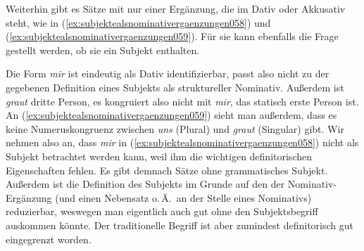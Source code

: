 \begin{exe}
  \ex\label{ex:subjektealsnominativergaenzungen052}
  \begin{xlist}
  \end{xlist}
  \ex\label{ex:subjektealsnominativergaenzungen055}
  \begin{xlist}
  \end{xlist}
\end{exe}

Weiterhin gibt es Sätze mit nur einer Ergänzung, die im Dativ oder Akkusativ steht, wie in (\ref{ex:subjektealsnominativergaenzungen058}) und (\ref{ex:subjektealsnominativergaenzungen059}).
Für sie kann ebenfalls die Frage gestellt werden, ob sie ein Subjekt enthalten.

\begin{exe}
\end{exe}

Die Form \textit{mir} ist eindeutig als Dativ identifizierbar, passt also nicht zu der gegebenen Definition eines Subjekts als struktureller Nominativ.
Außerdem ist \textit{graut} dritte Person, es kongruiert also nicht mit \textit{mir}, das statisch erste Person ist.
An (\ref{ex:subjektealsnominativergaenzungen059}) sieht man außerdem, dass es keine Numeruskongruenz zwischen \textit{uns} (Plural) und
\textit{graut} (Singular) gibt.
Wir nehmen also an, dass \textit{mir} in (\ref{ex:subjektealsnominativergaenzungen058}) nicht als Subjekt betrachtet werden kann, weil ihm die wichtigen definitorischen Eigenschaften fehlen.
Es gibt demnach Sätze ohne grammatisches Subjekt.
Außerdem ist die Definition des Subjekts im Grunde auf den der Nominativ-Ergänzung (und einen Nebensatz o.\,Ä.\ an der Stelle eines Nominativs) reduzierbar, weswegen man eigentlich auch gut ohne den Subjektsbegriff auskommen könnte.
Der traditionelle Begriff ist aber zumindest definitorisch gut eingegrenzt worden.



